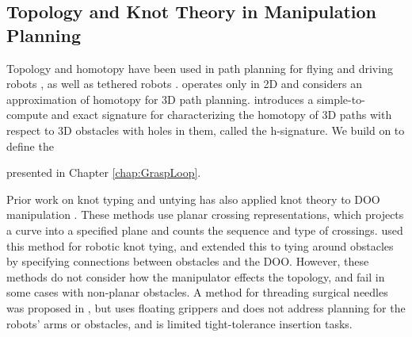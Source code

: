 \subsection{Topology and Knot Theory in Manipulation Planning}
Topology and homotopy have been used in path planning for flying and driving robots \cite{Bhattacharya11,Bhattacharya12}, as well as tethered robots \cite{TetherHomotopy}. \cite{TetherHomotopy} operates only in 2D and \cite{PDR_Jaillet} considers an approximation of homotopy for 3D path planning. \cite{Bhattacharya11} introduces a simple-to-compute and exact signature for characterizing the homotopy of 3D paths with respect to 3D obstacles with holes in them, called the h-signature. We build on \cite{Bhattacharya11} to define the \signature{} presented in Chapter \ref{chap:GraspLoop}.

Prior work on knot typing and untying has also applied knot theory to DOO manipulation \cite{WakamatsuKnots2005, Wakamatsu2006Untangling, Saha07, WeifuKnots, UntanglingHulk, Sundaresan2020, UntanglingFull}. These methods use planar crossing representations, which projects a curve into a specified plane and counts the sequence and type of crossings. \cite{Saha07} used this method for robotic knot tying, and extended this to tying around obstacles by specifying connections between obstacles and the DOO. However, these methods do not consider how the manipulator effects the topology, and fail in some cases with non-planar obstacles. A method for threading surgical needles was proposed in \cite{Weifu}, but uses floating grippers and does not address planning for the robots' arms or obstacles, and is limited tight-tolerance insertion tasks.